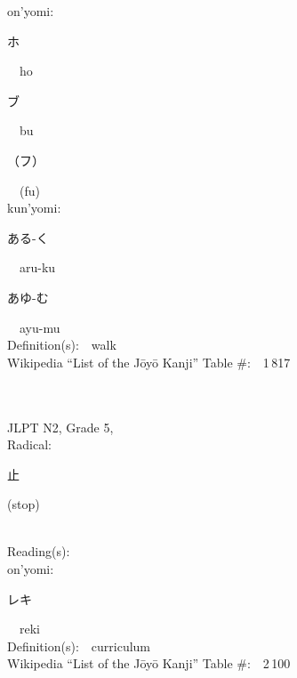 \begin{multicols}{2}
{\hspace*{1em}}on'yomi:\ \ \\
{\hspace*{2em}}{\begin{CJK}{UTF8}{min} ホ \end{CJK}}\ \ ho\ \ \\
{\hspace*{2em}}{\begin{CJK}{UTF8}{min} ブ \end{CJK}}\ \ bu\ \ \\
{\hspace*{2em}}{\begin{CJK}{UTF8}{min} （フ） \end{CJK}}\ \ (fu)\ \ \\
{\hspace*{1em}}kun'yomi:\ \ \\
{\hspace*{2em}}{\begin{CJK}{UTF8}{min} ある-く \end{CJK}}\ \ aru-ku\ \ \\
{\hspace*{2em}}{\begin{CJK}{UTF8}{min} あゆ-む \end{CJK}}\ \ ayu-mu\ \ \\
Definition(s):\ \ walk \\
Wikipedia ``List of the J\=oy\=o Kanji'' Table \#:\ \ 1\,817 \\
\ \ \\
{\fontsize{34pt}{40pt}  }\ \ \\  %
{JLPT N2, Grade 5, \\Radical:\ \ {\begin{CJK}{UTF8}{min} 止 \end{CJK}} (stop) } \\
Reading(s):\ \ \\
{\hspace*{1em}}on'yomi:\ \ \\
{\hspace*{2em}}{\begin{CJK}{UTF8}{min} レキ \end{CJK}}\ \ reki\ \ \\
Definition(s):\ \ curriculum \\
Wikipedia ``List of the J\=oy\=o Kanji'' Table \#:\ \ 2\,100 \\
\ \ \\
\end{multicols}


